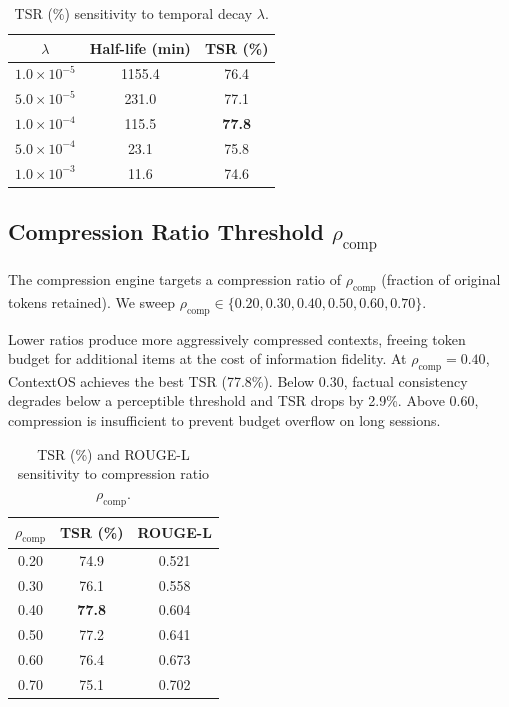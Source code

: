 \begin{table}[h!]
\centering
\caption{TSR (\%) sensitivity to temporal decay $\lambda$.}
\label{tab:app_lambda_sensitivity}
\begin{tabular}{@{}ccc@{}}
\toprule
$\lambda$ & \textbf{Half-life (min)} & \textbf{TSR (\%)} \\
\midrule
$1.0 \times 10^{-5}$ & 1155.4 & 76.4 \\
$5.0 \times 10^{-5}$ & 231.0  & 77.1 \\
$1.0 \times 10^{-4}$ & 115.5  & \textbf{77.8} \\
$5.0 \times 10^{-4}$ & 23.1   & 75.8 \\
$1.0 \times 10^{-3}$ & 11.6   & 74.6 \\
\bottomrule
\end{tabular}
\end{table}

\subsection{Compression Ratio Threshold $\rho_{\text{comp}}$}

The compression engine targets a compression ratio of $\rho_{\text{comp}}$
(fraction of original tokens retained).  We sweep
$\rho_{\text{comp}} \in \{0.20, 0.30, 0.40, 0.50, 0.60, 0.70\}$.

Lower ratios produce more aggressively compressed contexts, freeing token
budget for additional items at the cost of information fidelity.
At $\rho_{\text{comp}} = 0.40$, ContextOS achieves the best TSR (77.8\%).
Below 0.30, factual consistency degrades below a perceptible threshold and
TSR drops by 2.9\%.  Above 0.60, compression is insufficient to prevent
budget overflow on long sessions.

\begin{table}[h!]
\centering
\caption{TSR (\%) and ROUGE-L sensitivity to compression ratio $\rho_{\text{comp}}$.}
\label{tab:app_compression_ratio_sensitivity}
\begin{tabular}{@{}ccc@{}}
\toprule
$\rho_{\text{comp}}$ & \textbf{TSR (\%)} & \textbf{ROUGE-L} \\
\midrule
0.20 & 74.9 & 0.521 \\
0.30 & 76.1 & 0.558 \\
0.40 & \textbf{77.8} & 0.604 \\
0.50 & 77.2 & 0.641 \\
0.60 & 76.4 & 0.673 \\
0.70 & 75.1 & 0.702 \\
\bottomrule
\end{tabular}
\end{table}

